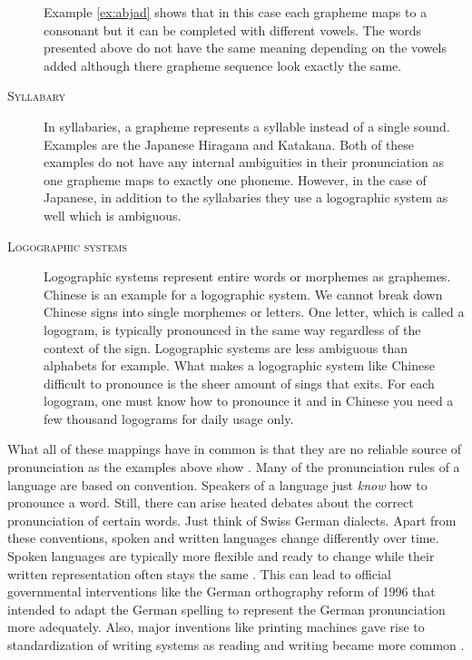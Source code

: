 \begin{description}
Example \ref{ex:abjad} shows that in this case each grapheme maps to a consonant but it can be completed with different vowels. The words presented above do not have the same meaning depending on the vowels added although there grapheme sequence look exactly the same. 

\item[\textsc{Syllabary}] In syllabaries, a grapheme represents a syllable instead of a single sound. Examples are the Japanese Hiragana and Katakana. Both of these examples do not have any internal ambiguities in their pronunciation as one grapheme maps to exactly one phoneme. However, in the case of Japanese, in addition to the syllabaries they use a logographic system as well which is ambiguous.  

\item[\textsc{Logographic systems}] Logographic systems represent entire words or morphemes as graphemes. Chinese is an example for a logographic system. We cannot break down Chinese signs into single morphemes or letters. One letter, which is called a logogram, is typically pronounced in the same way regardless of the context of the sign. Logographic systems are less ambiguous than alphabets for example. What makes a logographic system like Chinese difficult to pronounce is the sheer amount of sings that exits. For each logogram, one must know how to pronounce it and in Chinese you need a few thousand logograms for daily usage only.
\end{description}

What all of these mappings have in common is that they are no reliable source of pronunciation as the examples above show \citep{Intro.2007}. Many of the pronunciation rules of a language are based on convention. Speakers of a language just \textit{know} how to pronounce a word. Still, there can arise heated debates about the correct pronunciation of certain words. Just think of Swiss German dialects. Apart from these conventions, spoken and written languages change differently over time. Spoken languages are typically more flexible and ready to change while their written representation often stays the same \citep{unicode-lingu}. This can lead to official governmental interventions like the German orthography reform of 1996 that intended to adapt the German spelling to represent the German pronunciation more adequately. Also, major inventions like printing machines gave rise to standardization of writing systems as reading and writing became more common \citep{writing-systems}.

